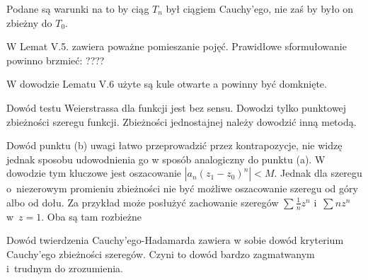 \documentclass[a4paper,11pt]{article}
\begin{document}
\vspace{\spaceFour}





\noindent
{} Podane są warunki na to by ciąg $T_{ n }$ był ciągiem Cauchy’ego,
nie zaś by było on zbieżny do $T_{ 0 }$.

\vspace{\spaceFour}





\noindent
{} W Lemat V.5. zawiera poważne pomieszanie pojęć. Prawidłowe
sformułowanie powinno brzmieć: ????

\vspace{\spaceFour}





\noindent
{} W dowodzie Lematu V.6 użyte są kule otwarte a powinny być
domknięte.

\vspace{\spaceFour}





\noindent
{} Dowód testu Weierstrassa dla funkcji jest bez sensu. Dowodzi tylko
punktowej zbieżności szeregu funkcji. Zbieżności jednostajnej należy
dowodzić inną metodą.

\vspace{\spaceFour}





\noindent
{} Dowód punktu (b) uwagi łatwo przeprowadzić przez kontrapozycje,
nie widzę jednak sposobu udowodnienia go w sposób analogiczny do punktu
(a). W dowodzie tym kluczowe jest oszacowanie
\mbox{$| a_{ n } ( z_{ 1 } - z_{ 0 } )^{ n } | < M$.} Jednak dla szeregu
o~niezerowym promieniu zbieżności nie być możliwe oszacowanie szeregu od
góry albo od dołu. Za przykład może posłużyć zachowanie szeregów
$\sum \frac{ 1 }{ n } z^{ n }$ i~$\sum n z^{ n }$ w~$z = 1$. Oba są tam
rozbieżne

\vspace{\spaceFour}





\noindent
{} Dowód twierdzenia Cauchy’ego-Hadamarda zawiera w sobie dowód
kryterium Cauchy’ego zbieżności szeregów. Czyni to dowód bardzo zagmatwanym
i~trudnym do zrozumienia.
\end{document}
